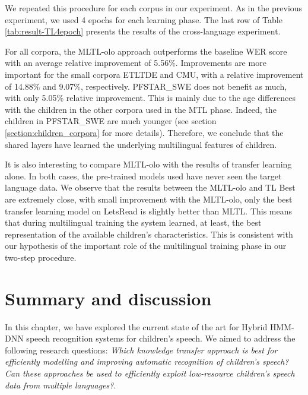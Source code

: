 We repeated this procedure for each corpus in our experiment. As in the previous experiment, we used 4 epochs for each learning phase. The last row of Table \ref{tab:result-TL4epoch} presents the results of the cross-language experiment.

For all corpora, the \ac{MLTL-olo} approach outperforms the baseline \ac{WER} score with an average relative improvement of 5.56\%. Improvements are more important for the small corpora ETLTDE and CMU, with a  relative improvement of 14.88\% and 9.07\%, respectively. PFSTAR\_SWE does not benefit as much, with only 5.05\% relative improvement. This is mainly due to the age differences with the children in the other corpora used in the \ac{MTL} phase. Indeed, the children in PFSTAR\_SWE are much younger (see section  \ref{section:children_corpora} for more details). Therefore, we conclude that the shared layers have learned the underlying multilingual features of children.

It is also interesting to compare \ac{MLTL-olo} with the results of transfer learning alone. In both cases, the pre-trained models used have never seen the target language data. We observe that the results between the \ac{MLTL-olo} and \ac{TL} Best are extremely close, with small improvement with the \ac{MLTL-olo}, only the best transfer learning model on LetsRead is slightly better than \ac{MLTL}. This means that during multilingual training the system learned, at least, the best representation of the available children's characteristics. This is consistent with our hypothesis of the important role of the multilingual training phase in our two-step procedure.

\section{Summary and discussion}
In this chapter, we have explored the current state of the art for Hybrid \ac{HMM-DNN} speech recognition systems for children's speech. We aimed to address the following research questions: \textit{Which knowledge transfer approach is best for efficiently modelling and improving automatic recognition of children's speech? Can these approaches be used to efficiently exploit low-resource children's speech data from multiple languages?}.


